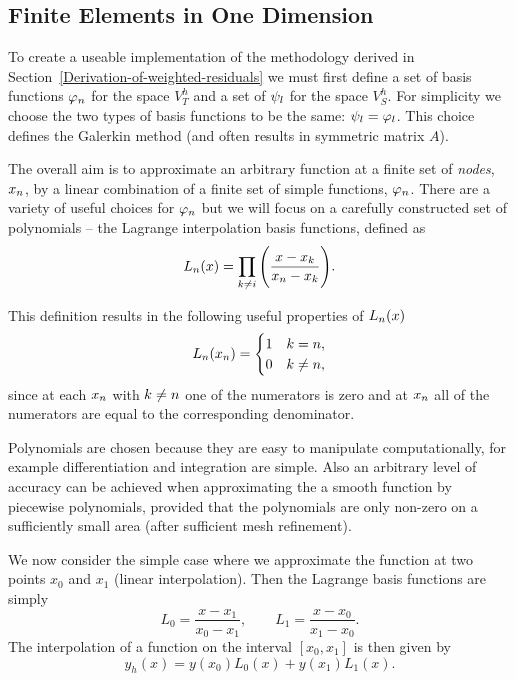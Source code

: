 \subsection{Finite Elements in One Dimension}
\label{sub:Actual-Finite-Elements}

To create a useable implementation of the methodology derived in Section~\ref{Derivation-of-weighted-residuals} we must first define a set of basis functions $\varphi_n$ for the space $V_{T}^{h}$ and a set of $\psi_l$ for the space $V_S^h$. For simplicity we choose the two types of basis functions to be the same: $\psi_l = \varphi_l$. This choice defines the Galerkin method (and often results in symmetric matrix $A$).\cite[pg. 215]{Zeinkiewicz1967}


The overall aim is to approximate an arbitrary function at a finite set of \emph{nodes}, $x_n$, by a linear combination of a finite set of simple functions, $\varphi_n$. There are a variety of useful choices for $\varphi_n$ but we will focus on a carefully constructed set of polynomials -- the Lagrange interpolation basis functions, defined as
\begin{equation*}
  L_n(x)=\prod_{k\neq i}\Bigg(\dfrac{x-x_{k}}{x_n-x_{k}}\Bigg).
\end{equation*}

This definition results in the following useful properties of $L_{n}(x)$
\begin{equation}
  \label{eq:35}
  L_{n}(x_{n}) =
  \begin{cases}
    1 & k = n, \\
    0 & k \neq n,
  \end{cases}
\end{equation}
since at each $x_{n}$ with $k \neq n$ one of the numerators is zero and at
$x_{n}$ all of the numerators are equal to the corresponding denominator.

Polynomials are chosen because they are easy to manipulate computationally, for example differentiation and integration are simple. Also an arbitrary level of accuracy can be achieved when approximating the a smooth function by piecewise polynomials, provided that the polynomials are only non-zero on a sufficiently small area (\ie after sufficient mesh refinement).

We now consider the simple case where we approximate the function at two points
$x_{0}$ and $x_{1}$ (linear interpolation). Then the Lagrange basis
functions are simply
\begin{equation}
  L_{0}=\dfrac{x-x_{1}}{x_{0}-x_{1}},\qquad
  L_{1}=\dfrac{x-x_{0}}{x_{1}-x_{0}}.
  \label{eq:simple_lagrange}
\end{equation}
The interpolation of a function on the interval $[x_{0},x_{1}]$ is then given by
\begin{equation*}
  y_{h}(x)=y(x_{0})L_{0}(x)+y(x_{1})L_{1}(x).
\end{equation*}


